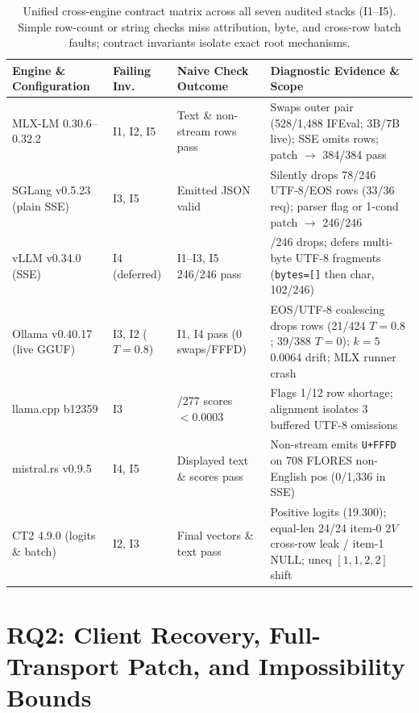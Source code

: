 \documentclass[11pt,letterpaper]{article}
\begin{document}
\begin{table}[t]
\centering
\setlength{\tabcolsep}{3.0pt}
\caption{Unified cross-engine contract matrix across all seven audited stacks (\textsc{I1}--\textsc{I5}). Simple row-count or string checks miss attribution, byte, and cross-row batch faults; contract invariants isolate exact root mechanisms.}
\label{tab:crosschecks}
\footnotesize
\begin{tabular}{@{}>{\raggedright\arraybackslash}p{.21\linewidth}>{\raggedright\arraybackslash}p{.13\linewidth}>{\raggedright\arraybackslash}p{.24\linewidth}>{\raggedright\arraybackslash}p{.35\linewidth}@{}}\toprule
Engine \& Configuration & Failing Inv. & Naive Check Outcome & Diagnostic Evidence \& Scope\\\midrule
MLX-LM 0.30.6--0.32.2 & \textsc{I1}, \textsc{I2}, \textsc{I5} & Text \& non-stream rows pass & Swaps outer pair (528/1,488 IFEval; 3B/7B live); SSE omits rows; patch $\to$ 384/384 pass\\
SGLang v0.5.23 (plain SSE) & \textsc{I3}, \textsc{I5} & Emitted JSON valid & Silently drops 78/246 UTF-8/EOS rows (33/36 req); parser flag or 1-cond patch $\to$ 246/246\\
vLLM v0.34.0 (SSE) & \textsc{I4} (deferred) & \textsc{I1--I3, I5} 246/246 pass & 0/246 drops; defers multi-byte UTF-8 fragments (\texttt{bytes=[]} then char, 102/246)\\
Ollama v0.40.17 (live GGUF) & \textsc{I3}, \textsc{I2} ($T{=}0.8$) & \textsc{I1}, \textsc{I4} pass (0 swaps/FFFD) & EOS/UTF-8 coalescing drops rows (21/424 $T{=}0.8$; 39/388 $T{=}0$); $k{=}5$ $0.0064$ drift; MLX runner crash\\
llama.cpp b12359 & \textsc{I3} & 277/277 scores $<0.0003$ & Flags 1/12 row shortage; alignment isolates 3 buffered UTF-8 omissions\\
mistral.rs v0.9.5 & \textsc{I4}, \textsc{I5} & Displayed text \& scores pass & Non-stream emits \texttt{U+FFFD} on 708 FLORES non-English pos (0/1,336 in SSE)\\
CT2 4.9.0 (logits \& batch) & \textsc{I2}, \textsc{I3} & Final vectors \& text pass & Positive logits (19.300); equal-len 24/24 item-0 $2V$ cross-row leak / item-1 NULL; uneq $[1,1,2,2]$ shift\\\bottomrule
\end{tabular}
\end{table}

\section{RQ2: Client Recovery, Full-Transport Patch, and Impossibility Bounds}
\label{sec:rq2}
\end{document}
